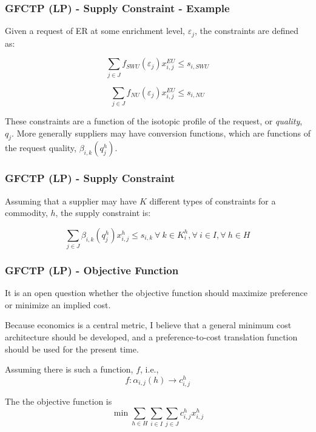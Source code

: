 \begin{frame}[ctb!]
  \frametitle{GFCTP (LP) - Supply Constraint - Example}
  
  Given a request of ER at some enrichment level, $\varepsilon_j$, the
  constraints are defined as:

  \begin{equation}
    \sum_{j \in J} f_{SWU}(\varepsilon_j) x_{i,j}^{EU} \leq s_{i,SWU} 
  \end{equation}

  \begin{equation}
    \sum_{j \in J} f_{NU}(\varepsilon_j) x_{i,j}^{EU} \leq s_{i,NU} 
  \end{equation}

  \pause

  These constraints are a function of the isotopic profile of the request, or
  \textit{quality}, $q_j$. More generally suppliers may have conversion
  functions, which are functions of the request quality,
  $\beta_{i,k}(q_{j}^{h})$.

\end{frame}

\begin{frame}[ctb!]
  \frametitle{GFCTP (LP) - Supply Constraint}
  
  Assuming that a supplier may have $K$ different types of constraints for a
  commodity, $h$, the supply constraint is:

  \begin{equation}
    \sum_{j \in J}\beta_{i,k}(q_{j}^{h}) x_{i,j}^{h} \leq s_{i,k} 
    \: \forall \: k \in K_{i}^{h},  
    \forall \: i \in I, \forall \: h \in H
  \end{equation}

\end{frame}

\begin{frame}[ctb!]
  \frametitle{GFCTP (LP) - Objective Function}

  It is an open question whether the objective function should maximize
  preference or minimize an implied cost.\vspace{0.2cm}

  Because economics is a central metric, I believe that a general minimum cost
  architecture should be developed, and a preference-to-cost translation
  function should be used for the present time.\vspace{0.2cm}

  Assuming there is such a function, $f$, i.e.,
  \begin{equation}
    f : \alpha_{i,j}(h) \to c_{i,j}^{h}
  \end{equation}

  The the objective function is
  \begin{equation}
    \min \sum_{h \in H}\sum_{i \in I}\sum_{j \in J}c_{i,j}^{h} x_{i,j}^{h} 
  \end{equation}

\end{frame}

